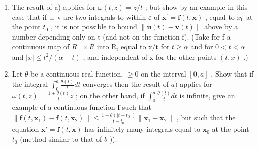 \begin{enumerate}
\def\labelenumi{\alph{enumi})}
\setcounter{enumi}{1}
\item
  The result of a) applies for \(\omega(t,z)=z/t\) ; but show by an example in this case that if u, v are two integrals to within \(\varepsilon\) of \(\mathbf{x}^{\prime}=\mathbf{f}(t,\mathbf{x})\) , equal to \(x_{0}\) at the point \(t_{0}\) , it is not possible to bound \(\|\mathbf{u}(t)-\mathbf{v}(t)\|\) above by a number depending only on t (and not on the function f). (Take for f a continuous map of \(R_{+}\times R\) into R, equal to x/t for \(t\geqslant\alpha\) and for \(0<t<\alpha\) and \(|x|\leqslant t^{2}/(\alpha-t)\) , and independent of x for the other points \((t,x)\) .)
\item
  Let \(\theta\) be a continuous real function, \(\geqslant 0\) on the interval \([0, a]\) . Show that if the integral \(\int_0^a \frac{\theta(t)}{t} dt\) converges then the result of \(a)\) applies for \(\omega(t, z) = \frac{1 + \theta(t)}{t} z\) ; on the other hand, if \(\int_0^a \frac{\theta(t)}{t} dt\) is infinite, give an example of a continuous function \(\mathbf{f}\) such that \(\| \mathbf{f}(t, \mathbf{x}_1) - \mathbf{f}(t, \mathbf{x}_2) \| \leqslant \frac{1 + \theta(|t - t_0|)}{|t - t_0|} \| \mathbf{x}_1 - \mathbf{x}_2 \|\) , but such that the equation \(\mathbf{x}' = \mathbf{f}(t, \mathbf{x})\) has infinitely many integrals equal to \(\mathbf{x}_0\) at the point \(t_0\) (method similar to that of \(b\) )).
\end{enumerate}

